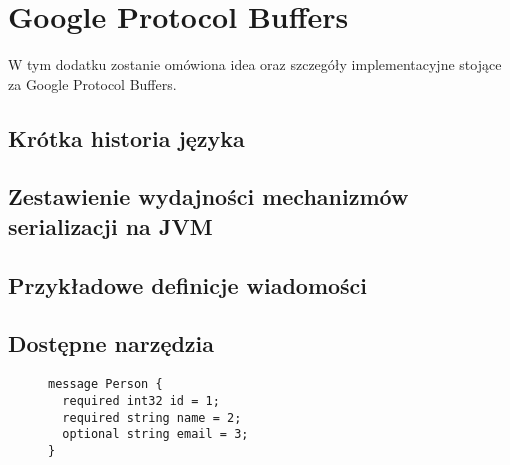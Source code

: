 \chapter{Google Protocol Buffers}
\label{cha:appendixA}
W tym dodatku zostanie omówiona idea oraz szczegóły implementacyjne stojące za Google Protocol Buffers.

\section{Krótka historia języka}
\label{sec:protobuf_history}

\section{Zestawienie wydajności mechanizmów serializacji na JVM}
\label{sec:serialization_speed}


\section{Przykładowe definicje wiadomości}
\label{sec:proto_file_examples}

\section{Dostępne narzędzia}
\label{sec:protobuf_available_tools}
\begin{figure}
\label{Najprostsza możliwa wiadomość ProtoBuf}
\begin{lstlisting}
message Person {
  required int32 id = 1;
  required string name = 2;
  optional string email = 3;
}
\end{lstlisting}
\end{figure}
